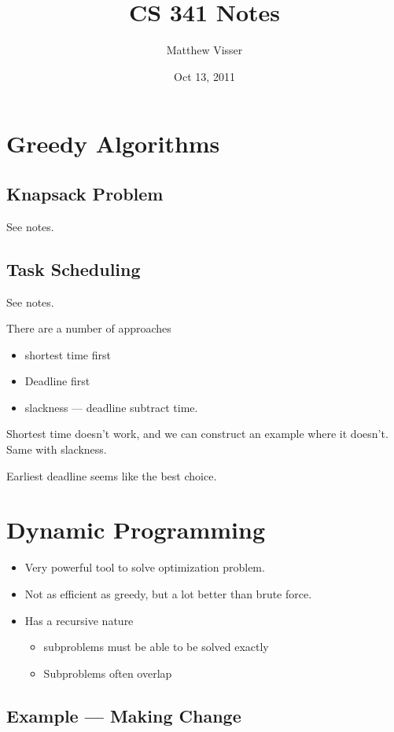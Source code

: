 \documentclass[12pt]{article}
\begin{document}
\title{CS 341 Notes}
\author{Matthew Visser}
\date{Oct 13, 2011}
\maketitle

\section{Greedy Algorithms}
\subsection{Knapsack Problem}

See notes.

\subsection{Task Scheduling}

See notes.

There are a number of approaches
\begin{itemize}
	\item shortest time first
	\item Deadline first
	\item slackness --- deadline subtract time.
\end{itemize}

Shortest time doesn't work, and we can construct an example where it doesn't.
Same with slackness.

Earliest deadline seems like the best choice.

\section{Dynamic Programming}

\begin{itemize}
	\item Very powerful tool to solve optimization problem.
	\item Not as efficient as greedy, but a lot better than brute force.
	\item Has a recursive nature
		\begin{itemize}
			\item subproblems must be able to be solved exactly
			\item Subproblems often overlap
		\end{itemize}
\end{itemize}

\subsection{Example --- Making Change}
\end{document}
